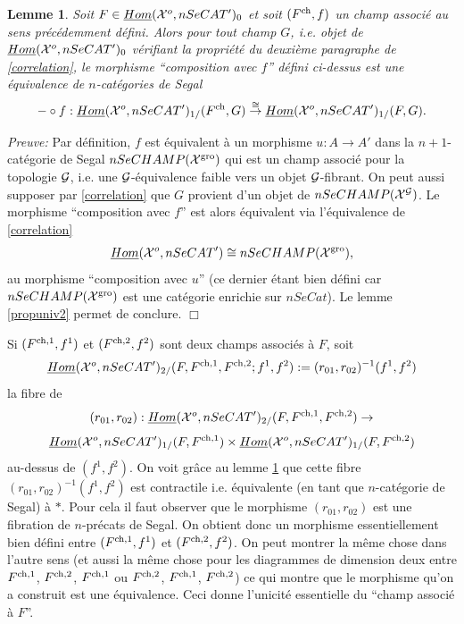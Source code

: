\documentclass[12pt]{article}
\newcommand{\eop}{\hfill $\Box$\vspace{.1in}}
\newtheorem{lemme}[lemma]{Lemme}
\newcommand{\Gg}{{\cal G}}
\newcommand{\Xx}{{\cal X}}
\begin{document}
\begin{lemme}
\label{propuniv3}
Soit $F\in \underline{Hom}(\Xx ^o, nSeCAT')_0$ et soit $(F^{\rm ch}, f)$
un champ associ\'e au sens pr\'ec\'edemment d\'efini. Alors pour tout champ
$G$, i.e. objet de $\underline{Hom}(\Xx ^o, nSeCAT')_0$ v\'erifiant la
propri\'et\'e du deuxi\`eme paragraphe de \ref{correlation}, le morphisme
``composition avec $f$'' d\'efini ci-dessus est une \'equivalence de
$n$-cat\'egories de Segal
$$
-\circ f : \underline{Hom}(\Xx ^o, nSeCAT')_{1/}(F^{\rm ch}, G)
\stackrel{\cong}{\rightarrow} \underline{Hom}(\Xx ^o, nSeCAT')_{1/}(F, G).
$$
\end{lemme}
{\em  Preuve:}
Par d\'efinition, $f$ est \'equivalent \`a un morphisme $u: A\rightarrow A'$
dans la $n+1$-cat\'egorie de Segal $nSeCHAMP(\Xx ^{\rm gro})$ qui est un champ
associ\'e pour la topologie $\Gg$, i.e. une $\Gg$-\'equivalence faible vers un
objet $\Gg$-fibrant. On peut aussi supposer par \ref{correlation} que $G$
provient d'un objet de $nSeCHAMP(\Xx ^{\Gg})$. Le morphisme ``composition avec
$f$'' est alors \'equivalent via l'\'equivalence de \ref{correlation}
$$
\underline{Hom}(\Xx ^o, nSeCAT')\cong
nSeCHAMP(\Xx ^{\rm gro}),
$$
au morphisme ``composition avec $u$'' (ce dernier \'etant bien d\'efini car
$nSeCHAMP(\Xx ^{\rm gro})$ est une cat\'egorie enrichie sur $nSeCat$). Le lemme
\ref{propuniv2} permet de conclure.
\eop

Si $(F^{\rm ch,1}, f^1)$ et $(F^{\rm ch,2}, f^2)$ sont deux champs associ\'es
\`a $F$, soit
$$
\underline{Hom}(\Xx ^o, nSeCAT')_{2/}(F,F^{\rm ch,1}, F^{\rm ch,2}; f^1, f^2)
:= (r_{01}, r_{02})^{-1}(f^1,f^2)
$$
la fibre de
$$
(r_{01}, r_{02}): \underline{Hom}(\Xx ^o, nSeCAT')_{2/}(F,F^{\rm ch,1}, F^{\rm
ch,2}) \rightarrow
$$
$$
\underline{Hom}(\Xx ^o, nSeCAT')_{1/}(F,F^{\rm ch,1})
\times
\underline{Hom}(\Xx ^o, nSeCAT')_{1/}(F, F^{\rm ch,2})
$$
au-dessus de $(f^1,f^2)$. On voit gr\^ace au lemme \ref{propuniv3} que
cette fibre $(r_{01}, r_{02})^{-1}(f^1,f^2)$ est contractile i.e. \'equivalente
(en tant que $n$-cat\'egorie de Segal) \`a $\ast$. Pour cela
il faut observer que le
morphisme $(r_{01}, r_{02})$ est une fibration de $n$-pr\'ecats de Segal.
On obtient donc un morphisme essentiellement bien d\'efini entre
$(F^{\rm ch,1}, f^1)$ et $(F^{\rm ch,2}, f^2)$.
On peut montrer la m\^eme chose dans l'autre sens
(et aussi la m\^eme chose  pour les diagrammes de dimension deux
entre $F^{\rm ch,1}$, $F^{\rm ch,2}$, $F^{\rm ch,1}$ ou
$F^{\rm ch,2}$, $F^{\rm ch,1}$, $F^{\rm ch,2}$) ce qui montre que le morphisme
qu'on a construit
est une \'equivalence. Ceci donne l'unicit\'e essentielle du ``champ associ\'e
\`a $F$''.
\end{document}
